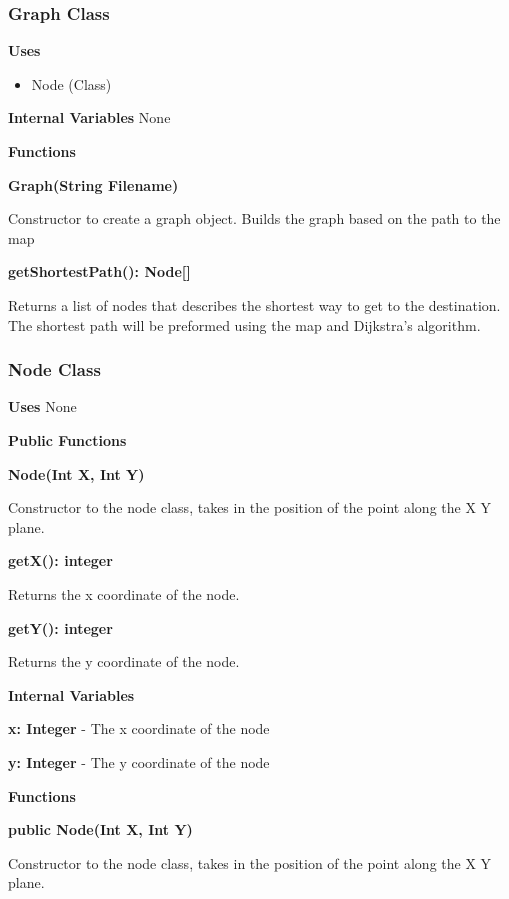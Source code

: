 \documentclass [10pt]{article}
\begin{document}

\subsubsection{Graph Class}
\textbf{Uses}
\begin{itemize}
	\item Node (Class)
\end{itemize}

\textbf{Internal Variables}
None 

\textbf{Functions}

\textbf{Graph(String Filename)}

Constructor to create a graph object. Builds the graph based on the path to the map

\textbf{getShortestPath(): Node[]}

Returns a list of nodes that describes the shortest way to get to the destination.  The shortest path will be preformed using the map and Dijkstra's algorithm.


\subsubsection{Node Class}

\textbf{Uses}
None 

\textbf{Public Functions}

\textbf{Node(Int X, Int Y)}

Constructor to the node class, takes in the position of the point along the X Y plane.

\textbf{getX(): integer}

Returns the x coordinate of the node.

\textbf{getY(): integer}

Returns the y coordinate of the node.

\textbf{Internal Variables}

\textbf{x: Integer} - The x coordinate of the node

\textbf{y: Integer} - The y coordinate of the node

\textbf{Functions}

\textbf{public Node(Int X, Int Y)}

Constructor to the node class, takes in the position of the point along the X Y plane.
\end{document}
